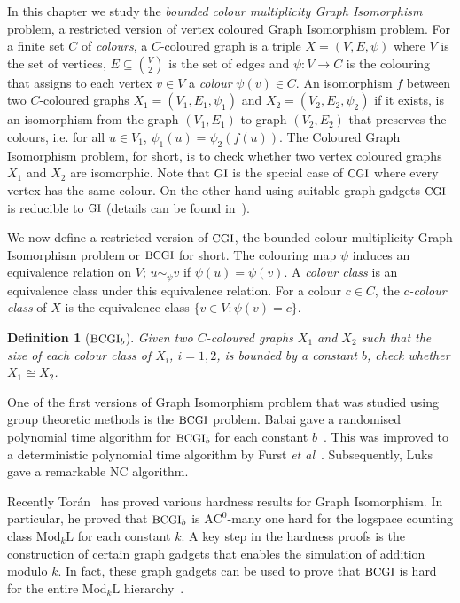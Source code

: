 \documentclass[11pt]{madras}%
\newtheorem{definition}[theorem]{Definition}
\theoremstyle{remark}
\newcommand{\ModkL}[1]{{\ensuremath{\mathrm{Mod}_{#1}\mathrm{L}}}}
\newcommand{\etal}[0]{{\emph{et al}}}
\newcommand{\ProblemFont}[1]{{\ensuremath{\textrm{\small #1}}}}
\begin{document}
In this chapter we study the \emph{bounded colour multiplicity Graph
  Isomorphism} problem, a restricted version of vertex coloured Graph
Isomorphism problem. For a finite set $C$ of \emph{colours}, a
$C$-coloured graph  is a triple $X = (V,E,\psi)$
where $V$ is the set of vertices, $E \subseteq {V \choose 2}$ is the
set of edges and $\psi : V \to C$ is the colouring that assigns to
each vertex $v \in V$ a \emph{colour} $\psi(v) \in C$.  An isomorphism
$f$ between two $C$-coloured graphs $X_1 = (V_1,E_1,\psi_1)$ and $X_2=
(V_2,E_2,\psi_2)$ if it exists, is an isomorphism from the graph
$(V_1,E_1)$ to graph $(V_2,E_2)$ that preserves the colours, i.e. for
all $u \in V_1$, $\psi_1(u) = \psi_2(f(u))$.  The Coloured Graph
Isomorphism problem, for short, is to check whether two vertex
coloured graphs $X_1$ and $X_2$ are isomorphic.  Note that
$\ProblemFont{GI}$ is the special case of $\ProblemFont{CGI}$ where
every vertex has the same colour. On the other hand using suitable
graph gadgets $\ProblemFont{CGI}$ is reducible to $\ProblemFont{GI}$
(details can be found in~\cite{gi-book}).

We now define a restricted version of $\ProblemFont{CGI}$, the bounded
colour multiplicity Graph Isomorphism problem or $\ProblemFont{BCGI}$
for short.  The colouring map $\psi$ induces an equivalence relation
on $V$; $u \sim_\psi v$ if $\psi(u) = \psi(v)$. A \emph{colour class}
is an equivalence class under this equivalence relation.  For a colour
$c \in C$, the \emph{$c$-colour class} of $X$ is the equivalence class
$\{ v \in V : \psi (v) = c \}$. 

\begin{definition}[$\ProblemFont{BCGI}_b$]
  Given two $C$-coloured graphs $X_1$ and $X_2$ such that the size of
  each colour class of $X_i$, $i =1,2$, is bounded by a constant $b$,
  check whether $X_1 \cong X_2$.
\end{definition}

One of the first versions of Graph Isomorphism problem that was
studied using group theoretic methods is the $\ProblemFont{BCGI}$
problem. Babai gave a randomised polynomial time algorithm for
$\ProblemFont{BCGI}_b$ for each constant $b$~\cite{babai79montecarlo}.
This was improved to a deterministic polynomial time algorithm by
Furst \etal~\cite{furst80polynomialtime}.  Subsequently,
Luks~\cite{luks86parallel} gave a remarkable $\mathrm{NC}$ algorithm.

Recently Tor\'an~\cite{toran2004hardness} has proved various hardness
results for Graph Isomorphism. In particular, he proved that
$\ProblemFont{BCGI}_b$ is $\mathrm{AC}^0$-many one hard for the
logspace counting class $\ModkL{k}$ for each constant $k$. A key step
in the hardness proofs is the construction of certain graph gadgets
that enables the simulation of addition modulo $k$. In fact, these
graph gadgets can be used to prove that $\ProblemFont{BCGI}$ is hard
for the entire $\ModkL{k}$
hierarchy~\cite[Appendix]{arvind2005bounded}.
\end{document}
